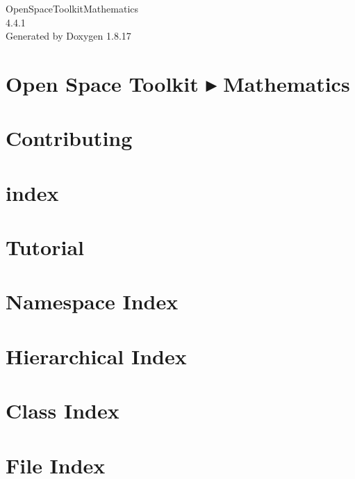 \let\mypdfximage\pdfximage\def\pdfximage{\immediate\mypdfximage}\documentclass[twoside]{book}
\newcommand{\+}{\discretionary{\mbox{\scriptsize$\hookleftarrow$}}{}{}}
\newcommand{\clearemptydoublepage}{%
  \newpage{\pagestyle{empty}\cleardoublepage}%
}
\begin{document}
\hypersetup{pageanchor=false,
             bookmarksnumbered=true,
             pdfencoding=unicode
            }
\begin{titlepage}
\vspace*{7cm}
\begin{center}%
{\Large Open\+Space\+Toolkit\+Mathematics \\[1ex]\large 4.\+4.\+1 }\\
\vspace*{1cm}
{\large Generated by Doxygen 1.8.17}\\
\end{center}
\end{titlepage}
\clearemptydoublepage
{}
\tableofcontents
\clearemptydoublepage
{}
\hypersetup{pageanchor=true}

\chapter{Open Space Toolkit ▸ Mathematics}
\label{index}\hypertarget{index}{}
\chapter{Contributing}
\label{md__c_o_n_t_r_i_b_u_t_i_n_g}

\chapter{index}
\label{md_docs_index}

\chapter{Tutorial}
\label{md_docs__tutorial}

\chapter{Namespace Index}

\chapter{Hierarchical Index}

\chapter{Class Index}

\chapter{File Index}

\end{document}
